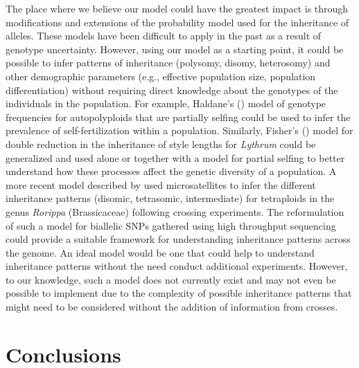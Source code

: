 \documentclass[11pt,english,letterpaper,oneside]{article}
\begin{document}
The place where we believe our model could have the greatest impact is through modifications and extensions of the probability model used for the inheritance of alleles. These models have been difficult to apply in the past as a result of genotype uncertainty. However, using our model as a starting point, it could be possible to infer patterns of inheritance (polysomy, disomy, heterosomy) and other demographic parameters (e.g., effective population size, population differentiation) without requiring direct knowledge about the genotypes of the individuals in the population. For example, Haldane's (\citeyear{haldane1930autopolyploids}) model of genotype frequencies for autopolyploids that are partially selfing could be used to infer the prevalence of self-fertilization within a population. Similarly, Fisher's (\citeyear{fisher1943doublereduction}) model for double reduction in the inheritance of style lengths for \textit{Lythrum} could be generalized and used alone or together with a model for partial selfing to better understand how these processes affect the genetic diversity of a population. A more recent model described by \cite{stift2008polyploidInheritance} used microsatellites to infer the different inheritance patterns (disomic, tetrasomic, intermediate) for tetraploids in the genus \textit{Rorippa} (Brassicaceae) following crossing experiments. The reformulation of such a model for biallelic SNPs gathered using high throughput sequencing could provide a suitable framework for understanding inheritance patterns across the genome. An ideal model would be one that could help to understand inheritance patterns without the need conduct additional experiments. However, to our knowledge, such a model does not currently exist and may not even be possible to implement due to the complexity of possible inheritance patterns that might need to be considered without the addition of information from crosses.
\medskip

\section{Conclusions}      %
\end{document}
